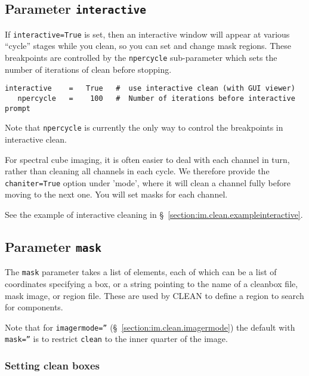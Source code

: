 \subsection{Parameter {\tt interactive} }
\label{section:im.clean.interactive}

If {\tt interactive=True} is set, then an interactive window
will appear at various ``cycle'' stages while you clean, so you
can set and change mask regions.  These breakpoints are controlled
by the {\tt npercycle} sub-parameter which sets the number of
iterations of clean before stopping.
\small
\begin{verbatim}
interactive    =   True   #  use interactive clean (with GUI viewer)
   npercycle   =    100   #  Number of iterations before interactive prompt
\end{verbatim}
\normalsize
Note that {\tt npercycle} is currently the only way to control the
breakpoints in interactive clean. 

For spectral cube imaging, it is often easier to deal with each
channel in turn, rather than cleaning all channels in each cycle.  We
therefore provide the {\tt chaniter=True} option under 'mode', where
it will clean a channel fully before moving to the next one.  You will
set masks for each channel. 

See the example of interactive cleaning in 
\S~\ref{section:im.clean.exampleinteractive}.

\subsection{Parameter {\tt mask} }
\label{section:im.clean.mask}

The {\tt mask} parameter takes a list of elements, each of which can
be a list of coordinates specifying a box,
or a string pointing to the name of a cleanbox file, mask image, or
region file.  These are used by CLEAN to define a region to search for components.  

Note that for {\tt imagermode=''} (\S~\ref{section:im.clean.imagermode}) 
the default with {\tt mask=''} is to restrict {\tt clean} to the inner
quarter of the image.

\subsubsection{Setting clean boxes }
\label{section:im.clean.mask.box}

